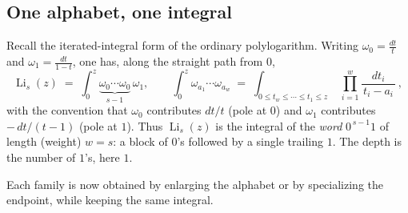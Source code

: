 \documentclass[11pt]{article}
\DeclareMathOperator{\Li}{Li}
\theoremstyle{plain}
\theoremstyle{remark}
\begin{document}
\subsection{One alphabet, one integral}

Recall the iterated-integral form of the ordinary polylogarithm. Writing $\omega_0=\frac{dt}{t}$ and $\omega_1=\frac{dt}{1-t}$, one has, along the straight path from $0$,
\[
  \Li_s(z)\;=\;\int_0^z \underbrace{\omega_0\cdots\omega_0}_{s-1}\,\omega_1,
  \qquad
  \int_0^z \omega_{a_1}\cdots\omega_{a_w}
  \;=\;\int_{0\le t_w\le\cdots\le t_1\le z}\;\prod_{i=1}^{w}\frac{dt_i}{\,t_i-a_i\,}\,,
\]
with the convention that $\omega_0$ contributes $dt/t$ (pole at $0$) and $\omega_1$ contributes $-\,dt/(t-1)$ (pole at $1$). Thus $\Li_s(z)$ is the integral of the \emph{word} $0^{\,s-1}1$ of length (weight) $w=s$: a block of $0$'s followed by a single trailing $1$. The depth is the number of $1$'s, here $1$.

Each family is now obtained by enlarging the alphabet or by specializing the endpoint, while keeping the same integral.
\end{document}
